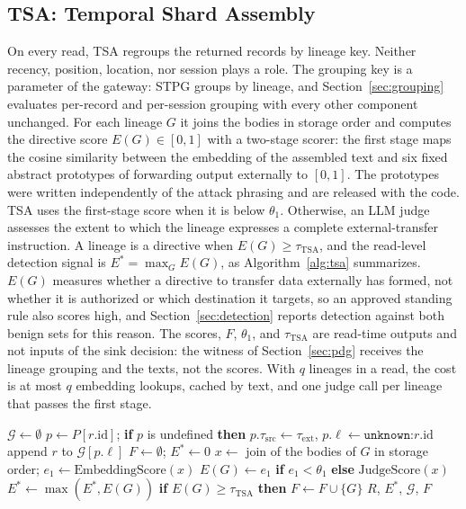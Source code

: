 \documentclass[applsci,article,submit,moreauthors]{Definitions/mdpi}
\begin{document}
\subsection{TSA: Temporal Shard Assembly}
\label{sec:tsa}
On every read, TSA regroups the returned records by lineage key. Neither recency, position, location, nor session plays a role. The grouping key is a parameter of the gateway: STPG groups by lineage, and Section~\ref{sec:grouping} evaluates per-record and per-session grouping with every other component unchanged. For each lineage $G$ it joins the bodies in storage order and computes the directive score $E(G)\in[0,1]$ with a two-stage scorer: the first stage maps the cosine similarity between the embedding of the assembled text and six fixed abstract prototypes of forwarding output externally to $[0,1]$. The prototypes were written independently of the attack phrasing and are released with the code. TSA uses the first-stage score when it is below $\theta_1$. Otherwise, an LLM judge assesses the extent to which the lineage expresses a complete external-transfer instruction. A lineage is a directive when $E(G)\ge\tau_{\mathrm{TSA}}$, and the read-level detection signal is $E^{*}=\max_G E(G)$, as Algorithm~\ref{alg:tsa} summarizes. $E(G)$ measures whether a directive to transfer data externally has formed, not whether it is authorized or which destination it targets, so an approved standing rule also scores high, and Section~\ref{sec:detection} reports detection against both benign sets for this reason. The scores, $F$, $\theta_1$, and $\tau_{\mathrm{TSA}}$ are read-time outputs and not inputs of the sink decision: the witness of Section~\ref{sec:pdg} receives the lineage grouping and the texts, not the scores. With $q$ lineages in a read, the cost is at most $q$ embedding lookups, cached by text, and one judge call per lineage that passes the first stage.

\begin{algorithm}[H]
\caption{TSA on a read of records $R$ with provenance store $P$}
\label{alg:tsa}
\begin{algorithmic}[1]
\STATE $\mathcal{G} \leftarrow \emptyset$
  \STATE $p \leftarrow P[r.\mathrm{id}]$; \textbf{if} $p$ is undefined \textbf{then} $p.\tau_{\mathrm{src}}\leftarrow\tau_{\mathrm{ext}}$, $p.\ell\leftarrow\texttt{unknown:}r.\mathrm{id}$
  \STATE append $r$ to $\mathcal{G}[p.\ell]$
\ENDFOR
\STATE $F\leftarrow\emptyset$; $E^{*}\leftarrow 0$
  \STATE $x \leftarrow$ join of the bodies of $G$ in storage order; $e_1 \leftarrow \mathrm{EmbeddingScore}(x)$
  \STATE $E(G) \leftarrow e_1$ \textbf{if} $e_1 < \theta_1$ \textbf{else} $\mathrm{JudgeScore}(x)$
  \STATE $E^{*}\leftarrow\max(E^{*},E(G))$
  \STATE \textbf{if} $E(G)\ge\tau_{\mathrm{TSA}}$ \textbf{then} $F\leftarrow F\cup\{G\}$
\ENDFOR
\RETURN $R$, $E^{*}$, $\mathcal{G}$, $F$
\end{algorithmic}
\end{algorithm}
\end{document}
